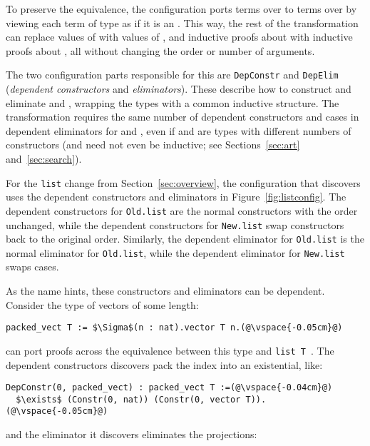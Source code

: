 
To preserve the equivalence, the configuration ports terms over \A to terms over \B by viewing each
term of type \B as if it is an \A.
This way, the rest of the transformation can replace values of \A with values of \B, and
inductive proofs about \A with inductive proofs about \B, %
all without changing the order or number of arguments.

The two configuration parts responsible for this are \lstinline{DepConstr}
and \lstinline{DepElim} (\textit{dependent constructors} and \textit{eliminators}).
These describe how to construct and eliminate \A and \B, wrapping the types with a common inductive structure.
The transformation requires the same number of dependent constructors and cases in dependent eliminators for \A and \B,
even if \A and \B are types with different numbers of constructors
(\A and \B need not even be inductive; see Sections~\ref{sec:art} and~\ref{sec:search}).

For the \lstinline{list} change from Section~\ref{sec:overview},
the configuration that \toolname discovers uses the dependent constructors
and eliminators in Figure~\ref{fig:listconfig}. The dependent constructors for \lstinline{Old.list}
are the normal constructors with the order unchanged,
while the dependent constructors for \lstinline{New.list} swap constructors
back to the original order.
Similarly, the dependent eliminator for \lstinline{Old.list} is the normal eliminator for \lstinline{Old.list},
while the dependent eliminator for \lstinline{New.list} swaps cases.

As the name hints, these constructors and eliminators can be dependent.
Consider the type of vectors of some length:

\begin{lstlisting}
packed_vect T := $\Sigma$(n : nat).vector T n.(@\vspace{-0.05cm}@)
\end{lstlisting}
\toolname can port proofs across the equivalence between this type and \lstinline{list T}~. %
The dependent constructors \toolname discovers pack the index into an existential, like:

\begin{lstlisting}
DepConstr(0, packed_vect) : packed_vect T :=(@\vspace{-0.04cm}@)
  $\exists$ (Constr(0, nat)) (Constr(0, vector T)).(@\vspace{-0.05cm}@)
\end{lstlisting}
and the eliminator it discovers eliminates the projections:

